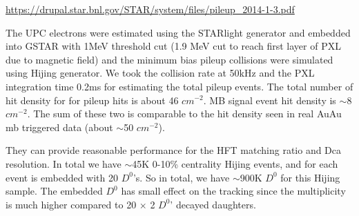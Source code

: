 \url{https://drupal.star.bnl.gov/STAR/system/files/pileup_2014-1-3.pdf}

The UPC electrons were estimated using the STARlight generator and embedded into GSTAR with 1MeV threshold cut (1.9 MeV cut to reach first layer of PXL due to magnetic field) and the minimum bias pileup collisions were simulated using Hijing generator.  We took the collision rate at 50kHz and the PXL integration time 0.2ms for estimating the total pileup events. The total number of hit density for for pileup hits is about 46 $cm^{-2}$. MB signal event hit density is $\sim$8 $cm^{-2}$. The sum of these two is comparable to the hit density seen in real AuAu mb triggered data (about $\sim$50 $cm^{-2}$).

They can provide reasonable performance for the HFT matching ratio and Dca resolution. 
In total we have $\sim$45K 0-10\% centrality Hijing events, and for each event is embedded with 20 $D^0$'s. So in total, we have $\sim$900K $D^0$ for this Hijing sample. The embedded $D^0$ has small effect on the tracking since the multiplicity is much higher compared to 20 $\times$ 2 $D^0$' decayed daughters.

